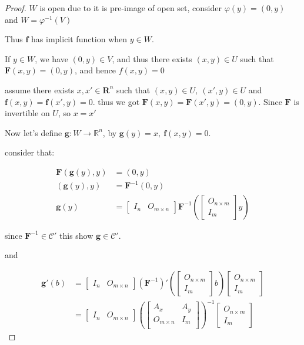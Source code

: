 \begin{proof}
    $W$ is open due to it is pre-image of open set, consider $\varphi(y) = (0,y)$ and $W = \varphi^{-1}(V)$

    Thus $\mathbf{f}$ has implicit function when $y \in W$.

    If $y \in W$, we have $(0,y) \in V$, and thus there exists $(x,y) \in U$ such that
    $\mathbf{F}(x,y) = (0,y)$, and hence $f(x,y) = 0$
    
    assume there exists $x, x' \in \mathbf{R}^{n}$ 
    such that $(x,y) \in U,\: (x',y) \in U$
    and $\mathbf{f}(x,y) = \mathbf{f}(x',y) = 0$.
    thus we got $\mathbf{F}(x,y) = \mathbf{F}(x',y) = (0,y)$. Since $\mathbf{F}$ 
    is invertible on $U$, so $x = x'$

    Now let's define $\mathbf{g}: W \to \mathbb{R}^n$, by $\mathbf{g}(y) = x, \: \mathbf{f}(x,y) = 0$.

    consider that:

    \begin{align*}
        \mathbf{F}(\mathbf{g}(y), y) &= (0, y)  \\
(\mathbf{g}(y), y) &= \mathbf{F}^{-1}(0, y) \\
        \mathbf{g}(y) &= \begin{bmatrix}
            I_n & O_{m \times n}
        \end{bmatrix} \mathbf{F}^{-1}(\begin{bmatrix}
            O_{n \times m} \\
            I_m
        \end{bmatrix} y)
    \end{align*}

    since $\mathbf{F}^{-1} \in \mathscr{C}'$ this show $\mathbf{g} \in \mathscr{C}'$. 

    and

    \begin{align*}
        \mathbf{g}'(b) &= \begin{bmatrix}
            I_n & O_{m \times n}
        \end{bmatrix} \left(\mathbf{F}^{-1}\right)'\left(\begin{bmatrix}
            O_{n \times m} \\
            I_m
        \end{bmatrix} b \right) \begin{bmatrix}
            O_{n \times m} \\
            I_m
        \end{bmatrix}\\
        &= \begin{bmatrix}
            I_n & O_{m \times n}
        \end{bmatrix}\left(\begin{bmatrix}
            A_x & A_y \\
            O_{m \times n} & I_m \\
        \end{bmatrix}\right)^{-1} \begin{bmatrix}
            O_{n \times m} \\
            I_m
        \end{bmatrix}
    \end{align*}


\end{proof}
